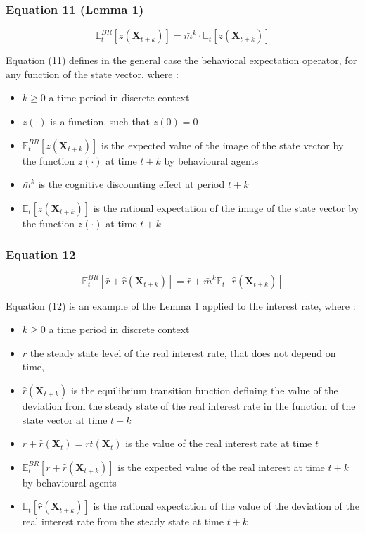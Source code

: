 \documentclass{article}
\begin{document}
\subsubsection*{Equation 11 (Lemma 1)}

\begin{equation}\tag{11}
    \mathbb{E}_{t}^{BR}\left[z\left(\bm{X}_{t+k}\right)\right]=\bar{m}^{k}\cdot\mathbb{E}_{t}\left[z\left(\bm{X}_{t+k}\right)\right]
\end{equation}

Equation (11) defines in the general case the behavioral expectation operator, for any function of the state vector, where : 
\begin{itemize}
    \item $k\geq 0$ a time period in discrete context
    \item $z(\cdot)$ is a function, such that $z(0)=0$
    \item $\mathbb{E}_{t}^{BR}\left[z\left(\bm{X}_{t+k}\right)\right]$ is the expected value of the image of the state vector by the function $z(\cdot)$ at time $t+k$ by behavioural agents
    \item $\bar{m}^{k}$ is the cognitive discounting effect at period $t+k$
    \item $\mathbb{E}_{t}\left[z\left(\bm{X}_{t+k}\right)\right]$ is the rational expectation of the image of the state vector by the function $z(\cdot)$ at time $t+k$
\end{itemize}

\subsubsection*{Equation 12}

\begin{equation}\tag{12}
    \mathbb{E}_{t}^{BR}\left[\bar{r}+\hat{r}\left(\bm{X}_{t+k}\right)\right]=\bar{r}+\bar{m}^{k}\mathbb{E}_{t}\left[\hat{r}(\bm{X}_{t+k})\right]
\end{equation}

Equation (12) is an example of the Lemma 1 applied to the interest rate, where :
\begin{itemize}
    \item $k\geq 0$ a time period in discrete context
    \item $\bar{r}$ the steady state level of the real interest rate, that does not depend on time,  
    \item $\hat{r}(\bm{X}_{t+k})$ is the equilibrium transition function defining the value of the deviation from the steady state of the real interest rate in the function of the state vector at time $t+k$
    \item $\bar{r}+\hat{r}(\bm{X}_{t})=r{t}(\bm{X}_{t})$ is the value of the real interest rate at time $t$
    \item $\mathbb{E}_{t}^{BR}\left[\bar{r}+\hat{r}(\bm{X}_{t+k})\right]$ is the expected value of the real interest at time $t+k$ by behavioural agents
    \item $\mathbb{E}_{t}\left[\hat{r}(\bm{X}_{t+k})\right]$ is the rational expectation of the value of the deviation of the real interest rate from the steady state at time $t+k$
\end{itemize}
\end{document}
